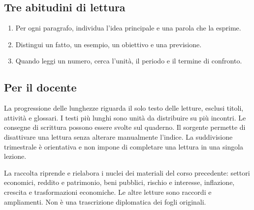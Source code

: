\subsection*{Tre abitudini di lettura}
\begin{enumerate}
\item Per ogni paragrafo, individua l'idea principale e una parola che la esprime.
\item Distingui un fatto, un esempio, un obiettivo e una previsione.
\item Quando leggi un numero, cerca l'unità, il periodo e il termine di confronto.
\end{enumerate}
\subsection*{Per il docente}
La progressione delle lunghezze riguarda il solo testo delle letture, esclusi titoli, attività e glossari. I testi più lunghi sono unità da distribuire su più incontri. Le consegne di scrittura possono essere svolte sul quaderno. Il sorgente permette di disattivare una lettura senza alterare manualmente l'indice. La suddivisione trimestrale è orientativa e non impone di completare una lettura in una singola lezione.

La raccolta riprende e rielabora i nuclei dei materiali del corso precedente: settori economici, reddito e patrimonio, beni pubblici, rischio e interesse, inflazione, crescita e trasformazioni economiche. Le altre letture sono raccordi e ampliamenti. Non è una trascrizione diplomatica dei fogli originali.
\clearpage
\tableofcontents
\clearpage{}


